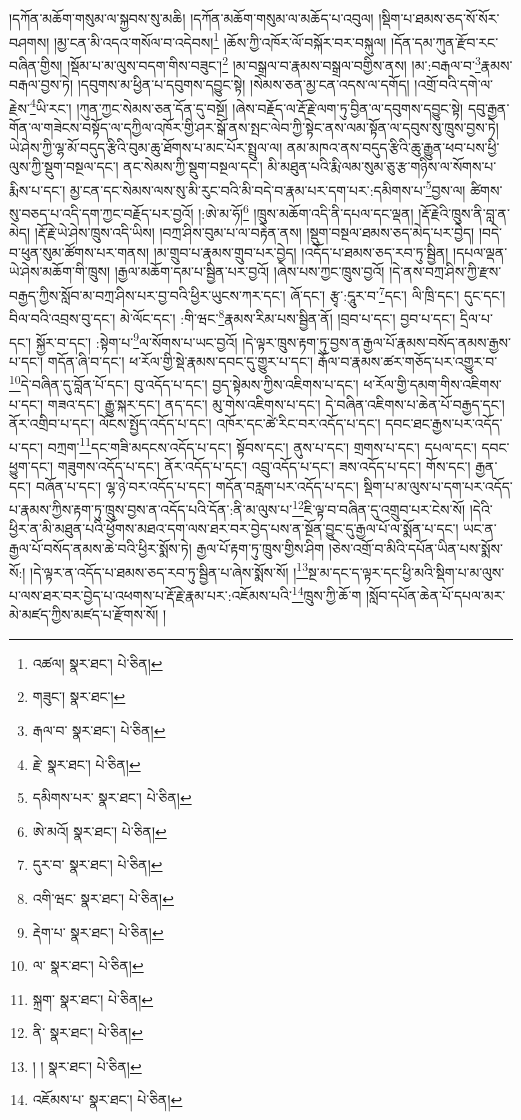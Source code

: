 །དཀོན་མཆོག་གསུམ་ལ་སྐྱབས་སུ་མཆི། །དཀོན་མཆོག་གསུམ་ལ་མཆོད་པ་འབུལ། །སྡིག་པ་ཐམས་ཅད་སོ་སོར་བཤགས། །མྱ་ངན་མི་འདའ་གསོལ་བ་འདེབས།\footnote{འཚལ།  སྣར་ཐང་།  པེ་ཅིན། } །ཆོས་ཀྱི་འཁོར་ལོ་བསྐོར་བར་བསྐུལ། །དོན་དམ་ཀུན་རྫོབ་རང་བཞིན་གྱིས། །སྡོམ་པ་མ་ལུས་བདག་གིས་བཟུང་།\footnote{གཟུང་།  སྣར་ཐང་། } །མ་བསྒྲལ་བ་རྣམས་བསྒྲལ་བགྱིས་ནས། །མ་:བརྒལ་བ་\footnote{རྒལ་བ་  སྣར་ཐང་།  པེ་ཅིན། }རྣམས་བརྒལ་བྱས་ཏེ། །དབུགས་མ་ཕྱིན་པ་དབུགས་དབྱུང་སྟེ། །སེམས་ཅན་མྱ་ངན་འདས་ལ་དགོད། །འགྲོ་བའི་དགེ་ལ་རྗེས་\footnote{རྗེ་  སྣར་ཐང་།  པེ་ཅིན། }ཡི་རང་། །ཀུན་ཀྱང་སེམས་ཅན་དོན་དུ་བསྔོ། །ཞེས་བརྗོད་ལ་རྡོ་རྗེ་ལག་ཏུ་བྱིན་ལ་དབུགས་དབྱུང་སྟེ། དབུ་རྒྱན་གོན་ལ་གཟེངས་བསྟོད་ལ་དཀྱིལ་འཁོར་གྱི་ཤར་སྒོ་ནས་སྤང་ལེབ་ཀྱི་སྟེང་ནས་ལམ་སྟོན་ལ་དབུས་སུ་ཁྲུས་བྱས་ཏེ། ཡེ་ཤེས་ཀྱི་ལྷ་མོ་བདུད་རྩིའི་བུམ་ཆུ་ཐོགས་པ་མང་པོར་སྤྲུལ་ལ། ནམ་མཁའ་ནས་བདུད་རྩིའི་ཆུ་རྒྱུན་ཕབ་པས་ཕྱི་ལུས་ཀྱི་སྡུག་བསྔལ་དང་། ནང་སེམས་ཀྱི་སྡུག་བསྔལ་དང་། མི་མཐུན་པའི་རྨི་ལམ་སུམ་ཅུ་རྩ་གཉིས་ལ་སོགས་པ་རྨིས་པ་དང་། མྱ་ངན་དང་སེམས་ལས་སུ་མི་རུང་བའི་མི་བདེ་བ་རྣམ་པར་དག་པར་:དམིགས་པ་\footnote{དམིགས་པར་  སྣར་ཐང་།  པེ་ཅིན། }བྱས་ལ། ཚིགས་སུ་བཅད་པ་འདི་དག་ཀྱང་བརྗོད་པར་བྱའོ། །:ཨེ་མ་ཧོ།\footnote{ཨེ་མའོ།  སྣར་ཐང་།  པེ་ཅིན། } །ཁྲུས་མཆོག་འདི་ནི་དཔལ་དང་ལྡན། །རྡོ་རྗེའི་ཁྲུས་ནི་བླ་ན་མེད། །རྡོ་རྗེ་ཡེ་ཤེས་ཁྲུས་འདི་ཡིས། །བཀྲ་ཤིས་བུམ་པ་ལ་བརྟེན་ནས། །སྡུག་བསྔལ་ཐམས་ཅད་མེད་པར་བྱེད། །བདེ་བ་ཕུན་སུམ་ཚོགས་པར་གནས། །མ་གྲུབ་པ་རྣམས་གྲུབ་པར་བྱེད། །འདོད་པ་ཐམས་ཅད་རབ་ཏུ་སྦྱིན། །དཔལ་ལྡན་ཡེ་ཤེས་མཆོག་གི་ཁྲུས། །རྒྱལ་མཆོག་དམ་པ་སྦྱིན་པར་བྱའོ། །ཞེས་པས་ཀྱང་ཁྲུས་བྱའོ། །དེ་ནས་བཀྲ་ཤིས་ཀྱི་རྫས་བརྒྱད་ཀྱིས་སློབ་མ་བཀྲ་ཤིས་པར་བྱ་བའི་ཕྱིར་ཡུངས་ཀར་དང་། ཞོ་དང་། རྩྭ་:དཱུར་བ་\footnote{དུར་བ་  སྣར་ཐང་།  པེ་ཅིན། }དང་། ལི་ཁྲི་དང་། དུང་དང་། བིལ་བའི་འབྲས་བུ་དང་། མེ་ལོང་དང་། :གི་ཝང་\footnote{འགི་ཝང་  སྣར་ཐང་།  པེ་ཅིན། }རྣམས་རིམ་པས་སྦྱིན་ནོ། །བྲབ་པ་དང་། བྱབ་པ་དང་། དྲིལ་པ་དང་། སྐྱོར་བ་དང་། :སྟེག་པ་\footnote{རྡེག་པ་  སྣར་ཐང་།  པེ་ཅིན། }ལ་སོགས་པ་ཡང་བྱའོ། །དེ་ལྟར་ཁྲུས་རྟག་ཏུ་བྱས་ན་རྒྱལ་པོ་རྣམས་བསོད་ནམས་རྒྱས་པ་དང་། གདོན་ཞི་བ་དང་། ཕ་རོལ་གྱི་སྡེ་རྣམས་དབང་དུ་གྱུར་པ་དང་། རྒོལ་བ་རྣམས་ཚར་གཅོད་པར་འགྱུར་བ་\footnote{ལ་  སྣར་ཐང་།  པེ་ཅིན། }དེ་བཞིན་དུ་བློན་པོ་དང་། བུ་འདོད་པ་དང་། བྱད་སྟེམས་ཀྱིས་འཇིགས་པ་དང་། ཕ་རོལ་གྱི་དམག་གིས་འཇིགས་པ་དང་། གཟའ་དང་། རྒྱུ་སྐར་དང་། ནད་དང་། མུ་གེས་འཇིགས་པ་དང་། དེ་བཞིན་འཇིགས་པ་ཆེན་པོ་བརྒྱད་དང་། ནོར་འགྲིབ་པ་དང་། ལོངས་སྤྱོད་འདོད་པ་དང་། འཁོར་དང་ཚེ་རིང་བར་འདོད་པ་དང་། དབང་ཐང་རྒྱས་པར་འདོད་པ་དང་། བཀྲག་\footnote{སྐྲག་  སྣར་ཐང་།  པེ་ཅིན། }དང་གཟི་མདངས་འདོད་པ་དང་། སྟོབས་དང་། ནུས་པ་དང་། གྲགས་པ་དང་། དཔལ་དང་། དབང་ཕྱུག་དང་། གཟུགས་འདོད་པ་དང་། ནོར་འདོད་པ་དང་། འབྲུ་འདོད་པ་དང་། ཟས་འདོད་པ་དང་། གོས་དང་། རྒྱན་དང་། བཞོན་པ་དང་། ལྷ་ཉེ་བར་འདོད་པ་དང་། གདོན་བརླག་པར་འདོད་པ་དང་། སྡིག་པ་མ་ལུས་པ་དག་པར་འདོད་པ་རྣམས་ཀྱིས་རྟག་ཏུ་ཁྲུས་བྱས་ན་འདོད་པའི་དོན་:ནི་མ་ལུས་པ་\footnote{ནི་  སྣར་ཐང་།  པེ་ཅིན། }ཇི་ལྟ་བ་བཞིན་དུ་འགྲུབ་པར་ངེས་སོ། །དེའི་ཕྱིར་ན་མི་མཐུན་པའི་ཕྱོགས་མཐའ་དག་ལས་ཐར་བར་བྱེད་པས་ན་སྔོན་བྱུང་དུ་རྒྱལ་པོ་ལ་སྨོན་པ་དང་། ཡང་ན་རྒྱལ་པོ་བསོད་ནམས་ཆེ་བའི་ཕྱིར་སྨོས་ཏེ། རྒྱལ་པོ་རྟག་ཏུ་ཁྲུས་གྱིས་ཤིག །ཅེས་འགྲོ་བ་མིའི་དཔོན་ཡིན་པས་སྨོས་སོ:། །དེ་ལྟར་ན་འདོད་པ་ཐམས་ཅད་རབ་ཏུ་སྦྱིན་པ་ཞེས་སྨོས་སོ། །\footnote{། །  སྣར་ཐང་།  པེ་ཅིན། }སྔ་མ་དང་ད་ལྟར་དང་ཕྱི་མའི་སྡིག་པ་མ་ལུས་པ་ལས་ཐར་བར་བྱེད་པ་འཕགས་པ་རྡོ་རྗེ་རྣམ་པར་:འཇོམས་པའི་\footnote{འཇོམས་པ་  སྣར་ཐང་།  པེ་ཅིན། }ཁྲུས་ཀྱི་ཆོ་ག །སློབ་དཔོན་ཆེན་པོ་དཔལ་མར་མེ་མཛད་ཀྱིས་མཛད་པ་རྫོགས་སོ། ། 